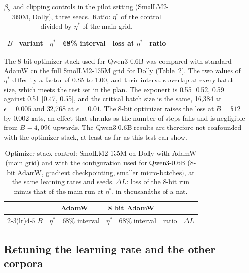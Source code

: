 \documentclass[10pt]{article}
\begin{document}
\begin{table}[t]
\centering
\caption{$\beta_2$ and clipping controls in the pilot setting (SmolLM2-360M, Dolly), three seeds. Ratio: $\eta^*$ of the control divided by $\eta^*$ of the main grid.}
\label{tab:controls}
\small
\begin{tabular}{rlccrr}
\toprule
$B$ & variant & $\eta^*$ & 68\% interval & loss at $\eta^*$ & ratio \\
\midrule

\end{tabular}
\end{table}

The 8-bit optimizer stack used for Qwen3-0.6B was compared with standard AdamW on the full SmolLM2-135M grid for Dolly (Table~\ref{tab:8bit}). The two values of $\eta^*$ differ by a factor of 0.85 to 1.00, and their intervals overlap at every batch size, which meets the test set in the plan. The exponent is 0.55 [0.52, 0.59] against 0.51 [0.47, 0.55], and the critical batch size is the same, 16,384 at $\epsilon = 0.005$ and 32,768 at $\epsilon = 0.01$. The 8-bit optimizer raises the loss at $B = 512$ by 0.002 nats, an effect that shrinks as the number of steps falls and is negligible from $B = 4{,}096$ upwards. The Qwen3-0.6B results are therefore not confounded with the optimizer stack, at least as far as this test can show.

\begin{table}[t]
\centering
\caption{Optimizer-stack control: SmolLM2-135M on Dolly with AdamW (main grid) and with the configuration used for Qwen3-0.6B (8-bit AdamW, gradient checkpointing, smaller micro-batches), at the same learning rates and seeds. $\Delta L$: loss of the 8-bit run minus that of the main run at $\eta^*$, in thousandths of a nat.}
\label{tab:8bit}
\small
\begin{tabular}{rccccrr}
\toprule
 & \multicolumn{2}{c}{AdamW} & \multicolumn{2}{c}{8-bit AdamW} & & \\
\cmidrule(lr){2-3}\cmidrule(lr){4-5}
$B$ & $\eta^*$ & 68\% interval & $\eta^*$ & 68\% interval & ratio & $\Delta L$ \\
\midrule

\end{tabular}
\end{table}

\subsection{Retuning the learning rate and the other corpora}\label{sec:transfer}
\end{document}
